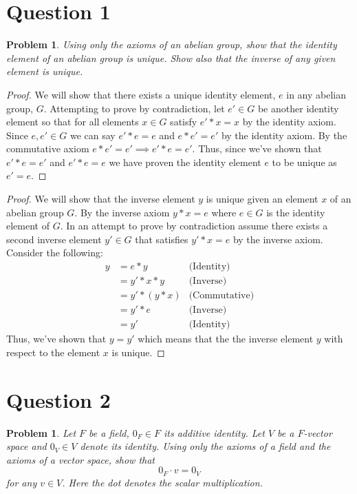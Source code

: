 \documentclass[12pt, letterpaper]{article}
\theoremstyle{plain}
\newtheorem{prob}[theorem]{Problem}
\theoremstyle{definition}
\theoremstyle{remark}
\begin{document}
\section{Question 1} %

\begin{prob} %
Using only the axioms of an abelian group, show that the identity element of an abelian group is unique. Show also that the inverse of any given element is unique.
\end{prob}

\begin{proof}
We will show that there exists a unique identity element, $e$ in any abelian group, $G$. Attempting to prove by contradiction, let $e'\in G$ be another identity element so that for all elements $x\in G$ satisfy $e'*x=x$ by the identity axiom. Since $e,e'\in G$ we can say $e'*e=e$ and $e*e'=e'$ by the identity axiom. By the commutative axiom $e*e'=e'\implies e'*e=e'$. Thus, since we've shown that $e'*e=e'$ and $e'*e=e$ we have proven the identity element $e$ to be unique as $e'=e$.
\end{proof}

\begin{proof}
We will show that the inverse element $y$ is unique given an element $x$ of an abelian group $G$. By the inverse axiom $y*x=e$ where $e\in G$ is the identity element of $G$. In an attempt to prove by contradiction assume there exists a second inverse element $y'\in G$ that satisfies $y'*x=e$ by the inverse axiom. Consider the following:
\begin{align*}
	y &= e*y 	&\text{(Identity)} \\
	  &= y'*x*y 	&\text{(Inverse)} \\
	  &= y'*(y*x)	&\text{(Commutative)} \\
	  &= y'*e	&\text{(Inverse)} \\
	  &= y'		&\text{(Identity)}
\end{align*}
Thus, we've shown that $y=y'$ which means that the the inverse element $y$ with respect to the element $x$ is unique.
\end{proof}


\section{Question 2} %

\begin{prob}
Let $F$ be a field, $0_F\in F$ its additive identity. Let $V$ be a $F$-vector space and $0_V\in V$ denote its identity. Using only the axioms of a field and the axioms of a vector space, show that $$0_F\cdot v=0_V$$ for any $v\in V$. Here the dot denotes the scalar multiplication.
\end{prob}
\end{document}
